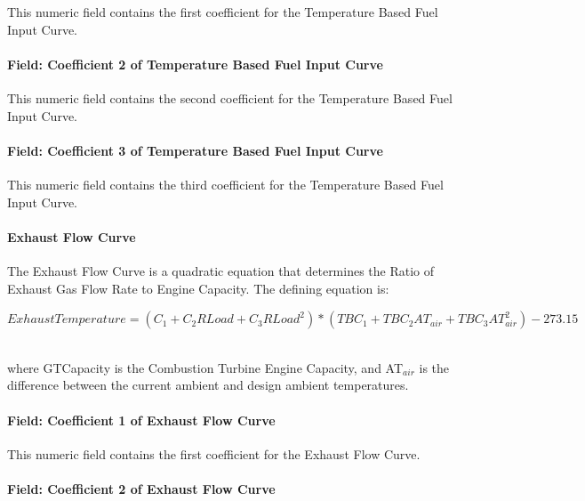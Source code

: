 This numeric field contains the first coefficient for the Temperature Based Fuel Input Curve.

\paragraph{Field: Coefficient 2 of Temperature Based Fuel Input Curve}\label{field-coefficient-2-of-temperature-based-fuel-input-curve}

This numeric field contains the second coefficient for the Temperature Based Fuel Input Curve.

\paragraph{Field: Coefficient 3 of Temperature Based Fuel Input Curve}\label{field-coefficient-3-of-temperature-based-fuel-input-curve}

This numeric field contains the third coefficient for the Temperature Based Fuel Input Curve.

\paragraph{Exhaust Flow Curve}\label{exhaust-flow-curve}

The Exhaust Flow Curve is a quadratic equation that determines the Ratio of Exhaust Gas Flow Rate to Engine Capacity. The defining equation is:

\emph{\(ExhaustTemperature = ({C_1} + {C_2}RLoad + {C_3}RLoa{d^2}) * (TB{C_1} + TB{C_2}A{T_{air}} + TB{C_3}AT_{air}^2) - 273.15\) ~}

where GTCapacity is the Combustion Turbine Engine Capacity, and AT\(_{air}\) is the difference between the current ambient and design ambient temperatures.

\paragraph{Field: Coefficient 1 of Exhaust Flow Curve}\label{field-coefficient-1-of-exhaust-flow-curve}

This numeric field contains the first coefficient for the Exhaust Flow Curve.

\paragraph{Field: Coefficient 2 of Exhaust Flow Curve}\label{field-coefficient-2-of-exhaust-flow-curve}

